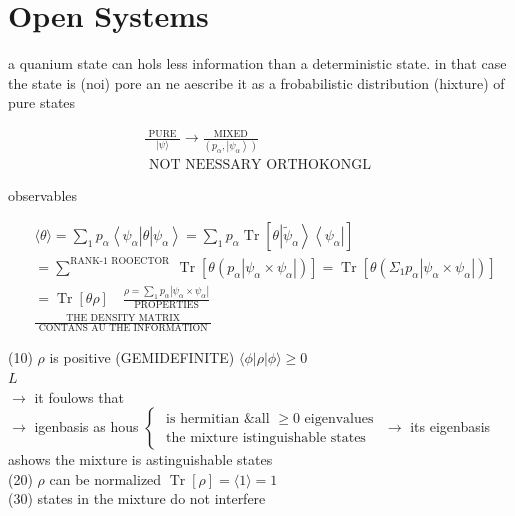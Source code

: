 \documentclass[10pt]{article}
\begin{document}
\captionsetup{singlelinecheck=false}
\section*{Open Systems}
a quanium state can hols less information than a deterministic state. in that case the state is (noi) pore an ne aescribe it as a frobabilistic distribution (hixture) of pure states

$$
\begin{gathered}
\frac{\text { PURE }}{|\psi\rangle} \longrightarrow \frac{\text { MIXED }}{\left(p_{\alpha},\left|\psi_{\alpha}\right\rangle\right)} \\
\text { NOT NEESSARY ORTHOKONGL }
\end{gathered}
$$

observables

$$
\begin{aligned}
&\langle\theta\rangle=\sum_{1} p_{\alpha}\left\langle\psi_{\alpha}\right| \theta\left|\psi_{\alpha}\right\rangle=\sum_{1} p_{\alpha} \operatorname{Tr}\left[\theta\left|\widetilde{\psi}_{\alpha}\right\rangle\left\langle\psi_{\alpha}\right|\right] \\
&=\sum^{\text {RANK-1 ROOECTOR }} \operatorname{Tr}\left[\theta\left(p_{\alpha}\left|\psi_{\alpha} \times \psi_{\alpha}\right|\right)\right]=\operatorname{Tr}\left[\theta\left(\Sigma_{1} p_{\alpha}\left|\psi_{\alpha} \times \psi_{\alpha}\right|\right)\right] \\
&=\operatorname{Tr}[\theta \rho] \quad \frac{\rho=\sum_{1} p_{\alpha}\left|\psi_{\alpha} \times \psi_{\alpha}\right|}{\text { PROPERTIES }} \\
& \frac{\text { THE DENSITY MATRIX }}{\text { CONTANS AU THE INFORMATION }}
\end{aligned}
$$

(10) $\rho$ is positive (GEMIDEFINITE) $\langle\phi| \rho|\phi\rangle \geqslant 0$\\
$L$\\
$\rightarrow$ it foulows that\\
$\rightarrow$ igenbasis as hous $\left\{\begin{array}{c}\text { is hermitian \& all } \geqslant 0 \text { eigenvalues } \\ \text { the mixture istinguishable states }\end{array}\right. \rightarrow$ its eigenbasis ashows the mixture is astinguishable states\\
(20) $\rho$ can be normalized $\operatorname{Tr}[\rho]=\langle 1\rangle=1$\\
(30) states in the mixture do not interfere
\end{document}
